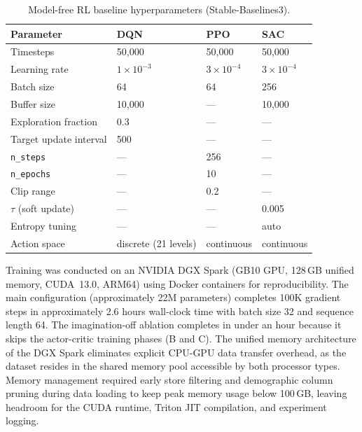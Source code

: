 \begin{table}[h]
\centering
\caption{Model-free RL baseline hyperparameters (Stable-Baselines3).}
\label{tab:rl-baseline-hyperparams}
\small
\begin{tabular}{@{}llll@{}}
\toprule
\textbf{Parameter} & \textbf{DQN} & \textbf{PPO} & \textbf{SAC} \\
\midrule
Timesteps & 50{,}000 & 50{,}000 & 50{,}000 \\
Learning rate & $1 \times 10^{-3}$ & $3 \times 10^{-4}$ & $3 \times 10^{-4}$ \\
Batch size & 64 & 64 & 256 \\
Buffer size & 10{,}000 & --- & 10{,}000 \\
Exploration fraction & 0.3 & --- & --- \\
Target update interval & 500 & --- & --- \\
\texttt{n\_steps} & --- & 256 & --- \\
\texttt{n\_epochs} & --- & 10 & --- \\
Clip range & --- & 0.2 & --- \\
$\tau$ (soft update) & --- & --- & 0.005 \\
Entropy tuning & --- & --- & auto \\
Action space & discrete (21 levels) & continuous & continuous \\
\bottomrule
\end{tabular}
\end{table}

Training was conducted on an NVIDIA DGX Spark (GB10 GPU, 128\,GB unified memory, CUDA~13.0, ARM64) using Docker containers for reproducibility. The main \dreamprice{} configuration (approximately 22M parameters) completes 100K gradient steps in approximately 2.6 hours wall-clock time with batch size 32 and sequence length 64. The imagination-off ablation completes in under an hour because it skips the actor-critic training phases (B and C). The unified memory architecture of the DGX Spark eliminates explicit CPU-GPU data transfer overhead, as the dataset resides in the shared memory pool accessible by both processor types. Memory management required early store filtering and demographic column pruning during data loading to keep peak memory usage below 100\,GB, leaving headroom for the CUDA runtime, Triton JIT compilation, and experiment logging.
